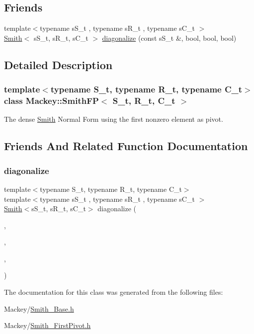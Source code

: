 \subsection*{Friends}
\begin{DoxyCompactItemize}
\item 
{\footnotesize template$<$typename s\+S\+\_\+t , typename s\+R\+\_\+t , typename s\+C\+\_\+t $>$ }\\\hyperlink{classMackey_1_1Smith}{Smith}$<$ s\+S\+\_\+t, s\+R\+\_\+t, s\+C\+\_\+t $>$ \hyperlink{classMackey_1_1SmithFP_a020186c97759855bd063eeaaf0a17351}{diagonalize} (const s\+S\+\_\+t \&, bool, bool, bool)
\end{DoxyCompactItemize}


\subsection{Detailed Description}
\subsubsection*{template$<$typename S\+\_\+t, typename R\+\_\+t, typename C\+\_\+t$>$\newline
class Mackey\+::\+Smith\+F\+P$<$ S\+\_\+t, R\+\_\+t, C\+\_\+t $>$}

The dense \hyperlink{classMackey_1_1Smith}{Smith} Normal Form using the first nonzero element as pivot. 

\subsection{Friends And Related Function Documentation}
\mbox{\label{classMackey_1_1SmithFP_a020186c97759855bd063eeaaf0a17351}} 
\subsubsection{\texorpdfstring{diagonalize}{diagonalize}}
{\footnotesize\ttfamily template$<$typename S\+\_\+t, typename R\+\_\+t, typename C\+\_\+t$>$ \\
template$<$typename s\+S\+\_\+t , typename s\+R\+\_\+t , typename s\+C\+\_\+t $>$ \\
\hyperlink{classMackey_1_1Smith}{Smith}$<$s\+S\+\_\+t, s\+R\+\_\+t, s\+C\+\_\+t$>$ diagonalize (\begin{DoxyParamCaption}\item[{const s\+S\+\_\+t \&}]{,  }\item[{bool}]{,  }\item[{bool}]{,  }\item[{bool}]{ }\end{DoxyParamCaption})\hspace{0.3cm}{\ttfamily [friend]}}



The documentation for this class was generated from the following files\+:\begin{DoxyCompactItemize}
\item 
Mackey/\hyperlink{Smith__Base_8h}{Smith\+\_\+\+Base.\+h}\item 
Mackey/\hyperlink{Smith__FirstPivot_8h}{Smith\+\_\+\+First\+Pivot.\+h}\end{DoxyCompactItemize}
